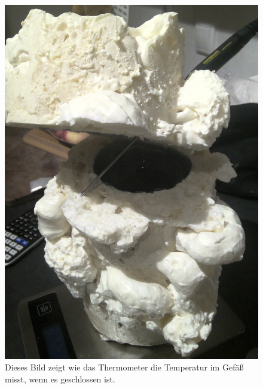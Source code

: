 \documentclass[11pt, ngerman]{scrartcl}
\begin{document}
\begin{figure}[H]
\begin{minipage}[t]{.30\linewidth}
            \includegraphics[width=\linewidth]{pics/Aufbau (3).jpg}
            \caption{Dieses Bild zeigt wie das Thermometer die Temperatur im Gefäß misst,
            wenn es geschlossen ist.}
            \label{fig:aufbauthermo}
        \end{minipage}
\end{figure}
\end{document}
